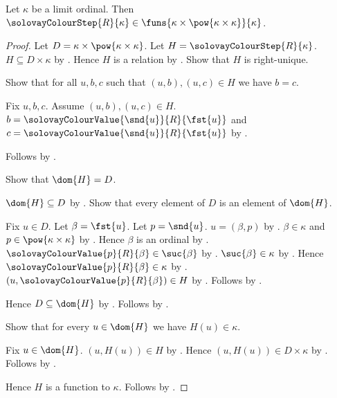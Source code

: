 \begin{theorem}\label{solovay_colour_step_type}
    Let $\kappa$ be a limit ordinal.
    Then $\solovayColourStep{R}{\kappa}
        \in\funs{\kappa\times\pow{\kappa\times\kappa}}{\kappa}$.
\end{theorem}
\begin{proof}
    Let $D=\kappa\times\pow{\kappa\times\kappa}$.
    Let $H=\solovayColourStep{R}{\kappa}$.
    $H\subseteq D\times\kappa$ by .
    Hence $H$ is a relation
        by .
    Show that $H$ is right-unique.
    \begin{subproof}
        Show that for all $u,b,c$ such that $(u,b),(u,c)\in H$
            we have $b=c$.
        \begin{subproof}
            Fix $u,b,c$.
            Assume $(u,b),(u,c)\in H$.
            $b=\solovayColourValue{\snd{u}}{R}{\fst{u}}$ and
                $c=\solovayColourValue{\snd{u}}{R}{\fst{u}}$
                by .
        \end{subproof}
        Follows by .
    \end{subproof}
    Show that $\dom{H}=D$.
    \begin{subproof}
        $\dom{H}\subseteq D$
            by .
        Show that every element of $D$ is an element of $\dom{H}$.
        \begin{subproof}
            Fix $u\in D$.
            Let $\beta=\fst{u}$.
            Let $p=\snd{u}$.
            $u=(\beta,p)$
                by .
            $\beta\in\kappa$ and $p\in\pow{\kappa\times\kappa}$
                by .
            Hence $\beta$ is an ordinal
                by .
            $\solovayColourValue{p}{R}{\beta}\in\suc{\beta}$
                by .
            $\suc{\beta}\in\kappa$ by .
            Hence $\solovayColourValue{p}{R}{\beta}\in\kappa$
                by .
            $(u,\solovayColourValue{p}{R}{\beta})\in H$
                by .
            Follows by .
        \end{subproof}
        Hence $D\subseteq\dom{H}$ by .
        Follows by .
    \end{subproof}
    Show that for every $u\in\dom{H}$ we have $H(u)\in\kappa$.
    \begin{subproof}
        Fix $u\in\dom{H}$.
        $(u,H(u))\in H$ by .
        Hence $(u,H(u))\in D\times\kappa$ by .
        Follows by .
    \end{subproof}
    Hence $H$ is a function to $\kappa$.
    Follows by .
\end{proof}

